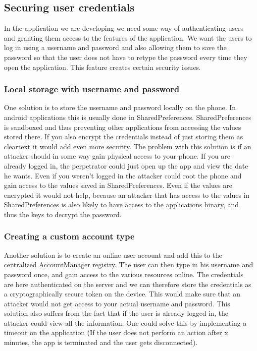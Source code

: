 \subsection{Securing user credentials}
In the application we are developing we need some way of authenticating users and granting them access to the features of the application. We want the users to log in using a username and password and also allowing them to save the password so that the user does not have to retype the password every time they open the application. This feature creates certain security issues. 

\subsubsection{Local storage with username and password}
One solution is to store the username and password locally on the phone. In android applications this is usually done in SharedPreferences. SharedPreferences is sandboxed and thus preventing other applications from accessing the values stored there. If you also encrypt the credentials instead of just storing them as cleartext it would add even more security. 
\newline
\newline
The problem with this solution is if an attacker should in some way gain physical access to your phone. If you are already logged in, the perpetrator could just open up the app and view the date he wants. Even if you weren’t logged in the attacker could root the phone and gain access to the values saved in SharedPreferences. Even if the values are encrypted it would not help, because an attacker that has access to the values in SharedPreferences is also likely to have access to the applications binary, and thus the keys to decrypt the password.

\subsubsection{Creating a custom account type}
Another solution is to create an online user account and add this to the centralized AccountManager registry. The user can then type in his username and password once, and gain access to the various resources online. The credentials are here authenticated on the server and we can therefore store the credentials as a cryptographically secure token on the device. This would make sure that an attacker would not get access to your actual username and password. 
\newline
\newline
This solution also suffers from the fact that if the user is already logged in, the attacker could view all the information. One could solve this by implementing a timeout on the application (If the user does not perform an action after x minutes, the app is terminated and the user gets disconnected).

